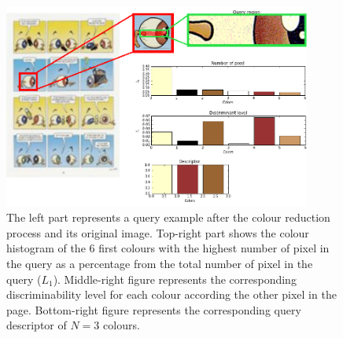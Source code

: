 



 \begin{figure}[!ht]	%
 	 \centering
 	\includegraphics[width=0.9\textwidth]{description_sequence.png}
 	\caption[Comic character query description]{The left part represents a query example after the colour reduction process and its original image. Top-right part shows the colour histogram of the 6 first colours with the highest number of pixel in the query as a percentage from the total number of pixel in the query ($L_1$). Middle-right figure represents the corresponding discriminability level for each colour according the other pixel in the page. Bottom-right figure represents the corresponding query descriptor of $N=3$ colours.}
 	\label{fig:in:dominant_colour_hist_desc}
 \end{figure}


